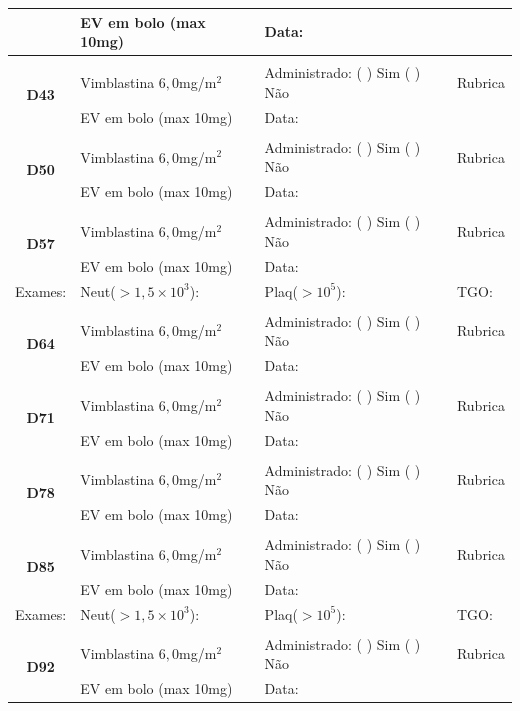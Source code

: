 \documentclass[11pt,a4paper,oldfontcommands]{memoir}
\begin{document}
\begin{center}
\begin{table}[H]
\begin{tabular}{p{}p{}|p{}|p{3cm}}
    \multicolumn{1}{c|}{}&{EV em bolo (max 10mg)}&{Data:}&\\
    \hline
    \\
    \hline
    \multicolumn{1}{c|}{\multirow{2}{*}{\textbf{D43}}}&{Vimblastina \(6,0\)mg/m\(^2\)}&{Administrado: (  ) Sim (  ) Não}&{Rubrica}\\
    \multicolumn{1}{c|}{}&{EV em bolo (max 10mg)}&{Data:}&\\
    \hline
    \\
    \hline
    \multicolumn{1}{c|}{\multirow{2}{*}{\textbf{D50}}}&{Vimblastina \(6,0\)mg/m\(^2\)}&{Administrado: (  ) Sim (  ) Não}&{Rubrica}\\
    \multicolumn{1}{c|}{}&{EV em bolo (max 10mg)}&{Data:}&\\
    \hline
    \\
    \hline
    \multicolumn{1}{c|}{\multirow{2}{*}{\textbf{D57}}}&{Vimblastina \(6,0\)mg/m\(^2\)}&{Administrado: (  ) Sim (  ) Não}&{Rubrica}\\
    \multicolumn{1}{c|}{}&{EV em bolo (max 10mg)}&{Data:}&\\
    \hline
    {Exames:}&{Neut(\(>1,5\times10^3\)):}&{Plaq(\(>10^5\)):}&{TGO:}
    \\
    \hline
    \\
    \hline
    \multicolumn{1}{c|}{\multirow{2}{*}{\textbf{D64}}}&{Vimblastina \(6,0\)mg/m\(^2\)}&{Administrado: (  ) Sim (  ) Não}&{Rubrica}\\
    \multicolumn{1}{c|}{}&{EV em bolo (max 10mg)}&{Data:}&\\
    \hline
    \\
    \hline
    \multicolumn{1}{c|}{\multirow{2}{*}{\textbf{D71}}}&{Vimblastina \(6,0\)mg/m\(^2\)}&{Administrado: (  ) Sim (  ) Não}&{Rubrica}\\
    \multicolumn{1}{c|}{}&{EV em bolo (max 10mg)}&{Data:}&\\
    \hline
    \\
    \hline
    \multicolumn{1}{c|}{\multirow{2}{*}{\textbf{D78}}}&{Vimblastina \(6,0\)mg/m\(^2\)}&{Administrado: (  ) Sim (  ) Não}&{Rubrica}\\
    \multicolumn{1}{c|}{}&{EV em bolo (max 10mg)}&{Data:}&\\
    \hline
    \\
    \hline
    \multicolumn{1}{c|}{\multirow{2}{*}{\textbf{D85}}}&{Vimblastina \(6,0\)mg/m\(^2\)}&{Administrado: (  ) Sim (  ) Não}&{Rubrica}\\
    \multicolumn{1}{c|}{}&{EV em bolo (max 10mg)}&{Data:}&\\
    \hline
    {Exames:}&{Neut(\(>1,5\times10^3\)):}&{Plaq(\(>10^5\)):}&{TGO:}
    \\
    \hline
    \\
    \hline
    \multicolumn{1}{c|}{\multirow{2}{*}{\textbf{D92}}}&{Vimblastina \(6,0\)mg/m\(^2\)}&{Administrado: (  ) Sim (  ) Não}&{Rubrica}\\
    \multicolumn{1}{c|}{}&{EV em bolo (max 10mg)}&{Data:}&\\
    \hline
\end{tabular}
\end{table}


\end{center}
\end{document}

